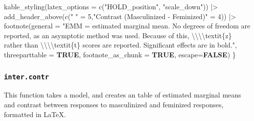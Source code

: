 \documentclass[
  bookmarksnumbered]{article}
\newenvironment{Shaded}{\begin{snugshade}}{\end{snugshade}}
\newcommand{\AttributeTok}[1]{\textcolor[rgb]{0.80,0.80,0.80}{#1}}
\newcommand{\ConstantTok}[1]{\textcolor[rgb]{0.86,0.64,0.64}{\textbf{#1}}}
\newcommand{\DecValTok}[1]{\textcolor[rgb]{0.86,0.86,0.80}{#1}}
\newcommand{\FunctionTok}[1]{\textcolor[rgb]{0.94,0.94,0.56}{#1}}
\newcommand{\NormalTok}[1]{\textcolor[rgb]{0.80,0.80,0.80}{#1}}
\newcommand{\OtherTok}[1]{\textcolor[rgb]{0.94,0.94,0.56}{#1}}
\newcommand{\SpecialCharTok}[1]{\textcolor[rgb]{0.86,0.64,0.64}{#1}}
\newcommand{\StringTok}[1]{\textcolor[rgb]{0.80,0.58,0.58}{#1}}
\begin{document}
\begin{Shaded}
\begin{Highlighting}[]
    \FunctionTok{kable\_styling}\NormalTok{(}\AttributeTok{latex\_options =} \FunctionTok{c}\NormalTok{(}\StringTok{"HOLD\_position"}\NormalTok{, }\StringTok{"scale\_down"}\NormalTok{)) }\SpecialCharTok{|\textgreater{}}
    \FunctionTok{add\_header\_above}\NormalTok{(}\FunctionTok{c}\NormalTok{(}\StringTok{" "} \OtherTok{=} \DecValTok{5}\NormalTok{,}\StringTok{"Contrast (Masculinized {-} Feminized)"} \OtherTok{=} \DecValTok{4}\NormalTok{)) }\SpecialCharTok{|\textgreater{}} 
    \FunctionTok{footnote}\NormalTok{(}\AttributeTok{general =} \StringTok{"EMM = estimated marginal mean. No degrees of freedom are reported, }
\StringTok{             as an asymptotic method was used. Because of this, }\SpecialCharTok{\textbackslash{}\textbackslash{}\textbackslash{}\textbackslash{}}\StringTok{textit\{z\} rather than }
\StringTok{             }\SpecialCharTok{\textbackslash{}\textbackslash{}\textbackslash{}\textbackslash{}}\StringTok{textit\{t\} scores are reported. Significant effects are in bold."}\NormalTok{,}
             \AttributeTok{threeparttable =} \ConstantTok{TRUE}\NormalTok{, }
             \AttributeTok{footnote\_as\_chunk =} \ConstantTok{TRUE}\NormalTok{, }
             \AttributeTok{escape=}\ConstantTok{FALSE}\NormalTok{)}
\NormalTok{\}}
\end{Highlighting}
\end{Shaded}

\subsubsection{\texorpdfstring{\texttt{inter.contr}}{inter.contr}}\label{inter.contr}

This function takes a model, and creates an table of estimated marginal means and contrast between responses to masculinized and feminized responses, formatted in \LaTeX.
\end{document}
